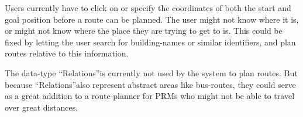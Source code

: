 Users currently have to click on or specify the coordinates of both the start and goal position before a route can be planned. The user might not know where it is, or might not know where the place they are trying to get to is. This could be fixed by letting the user search for building-names or similar identifiers, and plan routes relative to this information.

The data-type \textquotedblleft Relations\textquotedblright is currently not used by the system to plan routes. But because \textquotedblleft Relations\textquotedblright also represent abstract areas like bus-routes, they could serve as a great addition to a route-planner for PRMs who might not be able to travel over great distances.